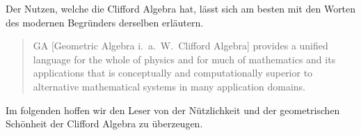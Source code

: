 
Der Nutzen, welche die Clifford Algebra hat, lässt sich am besten mit den Worten des modernen Begründers derselben erläutern.
%
%

\begin{quote}
GA [Geometric Algebra i.~a.~W.~Clifford Algebra]
provides a unified language for the whole of physics and for much of mathematics and its applications that is conceptually and computationally superior to alternative mathematical systems in many application domains. \cite{clifford:hestenes_GA} 
\end{quote}

Im folgenden hoffen wir den Leser von der Nützlichkeit und der geometrischen Schönheit der Clifford Algebra zu überzeugen.

